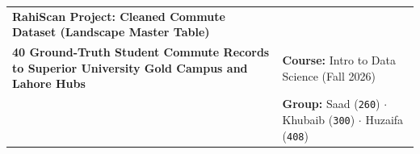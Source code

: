 \documentclass[9pt, a4paper, landscape]{article}
\begin{document}

\begin{tcolorbox}[enhanced, colback=navyblue, colframe=navyblue, arc=3pt, left=8pt, right=8pt, top=4pt, bottom=4pt]
  \begin{tabularx}{\linewidth}{X >{\raggedleft\arraybackslash}p{8.5cm}}
    {\fontsize{13pt}{15pt}\selectfont\color{white}\bfseries RahiScan Project: Cleaned Commute Dataset (Landscape Master Table)}\\[1.5pt]
    {\fontsize{8.5pt}{10.5pt}\selectfont\color{softteal}\textbf{40 Ground-Truth Student Commute Records to Superior University Gold Campus and Lahore Hubs}} &
    {\fontsize{8pt}{10pt}\selectfont\color{white!90!softblue}\textbf{Course:} Intro to Data Science (Fall 2026)}\\[1pt]
    & {\fontsize{8pt}{10pt}\selectfont\color{white!90!softblue}\textbf{Group:} Saad (\texttt{260}) \(\cdot\) Khubaib (\texttt{300}) \(\cdot\) Huzaifa (\texttt{408})}
  \end{tabularx}
\end{tcolorbox}

\vspace{-4pt}
\end{document}
